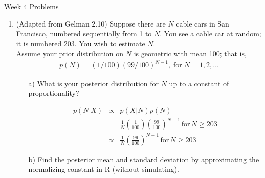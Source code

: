 \documentclass[10pt,a4paper]{article}
\author{Patrick Lam}
\newcommand{\red}{\color{red}}
\newcommand{\black}{\color{black}}
\begin{document}
\begin{center}
\begin{Large}Week 4 Problems\end{Large}
\end{center}
\bigskip
\begin{enumerate}

\item (Adapted from Gelman 2.10) Suppose there are $N$ cable cars in San Francisco, numbered sequentially from 1 to $N$.  You see a cable car at random; it is numbered 203.  You wish to estimate $N$. \\

Assume your prior distribution on $N$ is geometric with mean 100; that is,
\begin{eqnarray*}
p(N) = (1/100)(99/100)^{N-1}, \; \mathrm{for} \; N = 1,2,\dots
\end{eqnarray*}

\begin{itemize}
\item[a)] What is your posterior distribution for $N$ up to a constant of proportionality?   

\medskip \red
\begin{eqnarray*}
p(N|X) &\propto& p(X|N) p(N) \\
&=& \frac{1}{N} \left( \frac{1}{100} \right) \left( \frac{99}{100} \right)^{N-1} \, \mathrm{for} \, N\ge 203\\
&\propto& \frac{1}{N} \left( \frac{99}{100} \right)^{N-1} \, \mathrm{for} \, N\ge 203
\end{eqnarray*}
\medskip \black 

\item[b)] Find the posterior mean and standard deviation by approximating the normalizing constant in R (without simulating).  \\


\end{itemize}
\end{enumerate}
\end{document}
